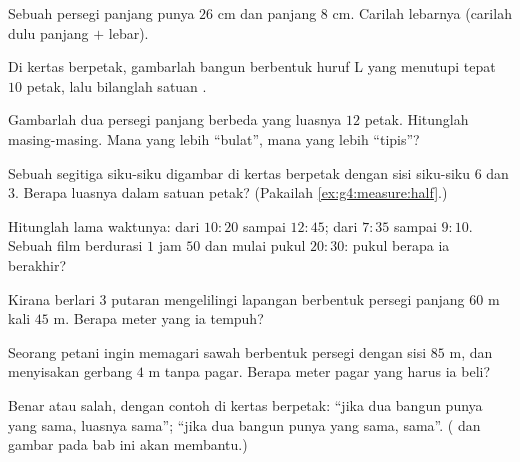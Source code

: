 \begin{exercise}[$\star$]\label{exo:g4:measure:4}
Sebuah persegi panjang punya  $26$ cm dan panjang $8$ cm.
Carilah lebarnya (carilah dulu panjang $+$ lebar).
\end{exercise}

\begin{exercise}[$\star$]\label{exo:g4:measure:5}
Di kertas berpetak, gambarlah bangun berbentuk huruf L yang menutupi
tepat $10$ petak, lalu bilanglah satuan .
\end{exercise}

\begin{exercise}[$\star$]\label{exo:g4:measure:6}
Gambarlah dua persegi panjang berbeda yang luasnya $12$ petak.
Hitunglah  masing-masing. Mana yang lebih ``bulat'', mana yang lebih ``tipis''?
\end{exercise}

\begin{exercise}[$\star$]\label{exo:g4:measure:7}
Sebuah segitiga siku-siku digambar di kertas berpetak dengan sisi
siku-siku $6$ dan $3$. Berapa luasnya dalam satuan petak? (Pakailah \cref{ex:g4:measure:half}.)
\end{exercise}

\begin{exercise}[$\star$]\label{exo:g4:measure:8}
Hitunglah lama waktunya: dari $10{:}20$ sampai $12{:}45$; dari
$7{:}35$ sampai $9{:}10$. Sebuah film berdurasi $1$ jam $50$ dan
mulai pukul $20{:}30$: pukul berapa ia berakhir?
\end{exercise}

\begin{exercise}[$\star$]\label{exo:g4:measure:9}
Kirana berlari $3$ putaran mengelilingi lapangan berbentuk persegi
panjang $60$ m kali $45$ m. Berapa meter yang ia tempuh?
\end{exercise}

\begin{exercise}[$\star\star$]\label{exo:g4:measure:10}
Seorang petani ingin memagari sawah berbentuk persegi dengan sisi
$85$ m, dan menyisakan gerbang $4$ m tanpa pagar. Berapa meter pagar yang harus ia beli?
\end{exercise}

\begin{exercise}[$\star\star$]\label{exo:g4:measure:11}
Benar atau salah, dengan contoh di kertas berpetak: ``jika dua
bangun punya  yang sama, luasnya sama''; ``jika dua bangun
punya  yang sama,  sama''.
( dan gambar pada bab ini akan membantu.)

\end{exercise}
